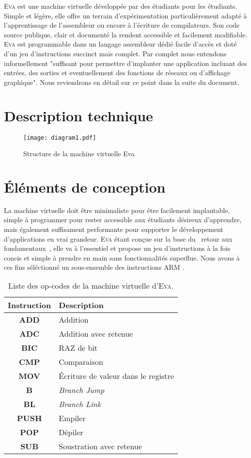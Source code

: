 \documentclass[11pt,twoside,french]{article}
\makeatletter
\providecommand{\og}{\leavevmode\flqq~}%
\providecommand{\fg}{\ifdim\lastskip>\z@\unskip\fi~\frqq}%
\newcommand{\noun}[1]{\textsc{#1}}
\makeatother
\begin{document}
\noun{Eva} est une machine virtuelle développée par des étudiants pour les
étudiants. Simple et légère, elle offre un terrain d'expérimentation
particulièrement adapté à l'apprentissage de l'assembleur ou encore
à l'écriture de compilateurs. Son code source publique, clair et documenté
la rendent accessible et facilement modifiable. \noun{Eva} est programmable
dans un langage assembleur dédié facile d'accès et doté d'un jeu d'instructions
succinct mais complet. Par complet nous entendons informellement "suffisant pour permettre d'implanter une application incluant des entrées, des sorties et eventuellement des fonctions de réseaux ou d'affichage graphique". Nous reviendrons en détail sur ce point dans la suite du document.

\vfill{}

\section{Description technique}

\begin{figure}[h!]
  \texttt{[image: diagram1.pdf]}
  \caption{\label{fig:diagram1} Structure de la machine virtuelle Eva}
\end{figure}

\vfill{}


\section{Éléments de conception}

La machine virtuelle doit être minimaliste pour être facilement implantable,
simple à programmer pour rester accessible aux étudiants désireux
d'apprendre, mais également suffisament performante pour supporter
le développement d'applications en vrai grandeur. \noun{Eva} étant
conçue sur la base du \og retour aux fondamentaux\fg , elle va à l'essentiel
et propose un jeu d'instructions à la fois concis et simple à prendre
en main sans fonctionnalités superflue. Nous avons à ces fins séléctionné
un sous-ensemble des instructions ARM .
\begin{table}[bp]
\begin{centering}
\begin{tabular}{|c|l|}
\hline
\textbf{Instruction} & \textbf{Description}\tabularnewline
\hline
\hline
\textbf{ADD} & Addition\tabularnewline
\hline
\textbf{ADC} & Addition avec retenue\tabularnewline
\hline
\textbf{BIC} & RAZ de bit\tabularnewline
\hline
\textbf{CMP} & Comparaison\tabularnewline
\hline
\textbf{MOV} & Écriture de valeur dans le registre\tabularnewline
\hline
\textbf{B} & \emph{Branch Jump}\tabularnewline
\hline
\textbf{BL} & \emph{Branch Link}\tabularnewline
\hline
\textbf{PUSH} & Empiler\tabularnewline
\hline
\textbf{POP} & Dépiler\tabularnewline
\hline
\textbf{SUB} & Soustration avec retenue\tabularnewline
\hline
\end{tabular}
\par\end{centering}
\caption{\label{tab:opcodes}Liste des op-codes de la machine virtuelle d'\noun{Eva}.}
\end{table}
\end{document}
